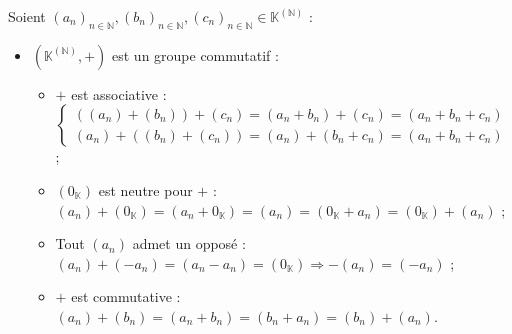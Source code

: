 \documentclass[12pt,a4paper]{report}
\begin{document}
    \begin{demo}
    Soient $(a_n)_{n \in \mathbb{N}}, (b_n)_{n \in \mathbb{N}}, (c_n)_{n \in \mathbb{N}} \in \mathbb{K}^{(\mathbb{N})}$ :
    \begin{itemize}
        \item $\left(\mathbb{K}^{(\mathbb{N})}, +\right)$ est un groupe commutatif :
        \begin{itemize}
            \item $+$ est associative : $ \left\lbrace \begin{array}{r} \left( (a_n) + (b_n) \right) + (c_n) = (a_n + b_n) + (c_n) = (a_n + b_n + c_n) \\ (a_n) + \left( (b_n) + (c_n) \right) = (a_n) + (b_n + c_n) = (a_n + b_n + c_n) \end{array} \right.$ ;
            \item $(0_\mathbb{K})$ est neutre pour $+$ : $(a_n) + (0_\mathbb{K}) = (a_n + 0_\mathbb{K}) = (a_n) = (0_\mathbb{K} + a_n) = (0_\mathbb{K}) + (a_n)$ ;
            \item Tout $(a_n)$ admet un opposé : $(a_n) + (-a_n) = (a_n - a_n) = (0_\mathbb{K}) \Rightarrow -(a_n) = (-a_n)$ ;
            \item $+$ est commutative : $(a_n) + (b_n) = (a_n + b_n) = (b_n + a_n) = (b_n) + (a_n)$.
        \end{itemize}
        

\end{itemize}
\end{demo}
\end{document}
